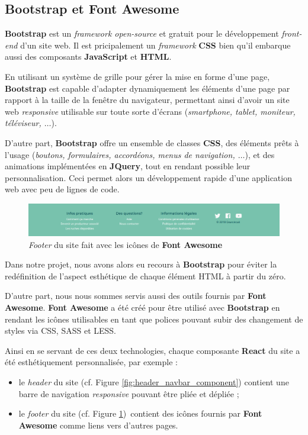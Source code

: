\documentclass[a4paper,12pt]{report}
\theoremstyle{break}
\theoremstyle{break}
\theoremstyle{break}
\theoremstyle{break}
\theoremstyle{definition}
\theoremstyle{remark}
\begin{document}
\subsection{Bootstrap et Font Awesome}
\textbf{Bootstrap} est un \textit{framework open-source} et gratuit pour le développement \textit{front-end} d'un site web. Il est pricipalement un \textit{framework} \textbf{CSS} bien qu'il embarque aussi des composants \textbf{JavaScript} et \textbf{HTML}.

En utilisant un système de grille pour gérer la mise en forme d'une page, \textbf{Bootstrap} est capable d'adapter dynamiquement les éléments d'une page par rapport à la taille de la fenêtre du navigateur, permettant ainsi d'avoir un site web \textit{responsive} utilisable sur toute sorte d'écrans (\textit{smartphone, tablet, moniteur, téléviseur, $\dots$}).

D'autre part, \textbf{Bootstrap} offre un ensemble de classes \textbf{CSS}, des éléments prêts à l'usage (\textit{boutons, formulaires, accordéons, menus de navigation, $\dots$}), et des animations implémentées en \textbf{JQuery}, tout en rendant possible leur personnalisation. Ceci permet alors un développement rapide d'une application web avec peu de lignes de code.

\begin{figure}[!ht]
  \centering
  \includegraphics[scale=0.35]{images/footer.png}
  \caption{\textit{Footer} du site fait avec les icônes de \textbf{Font Awesome}}
  \label{fig:footer_font_awesome}
\end{figure}

Dans notre projet, nous avons alors eu recours à \textbf{Bootstrap} pour éviter la redéfinition de l'aspect esthétique de chaque élément HTML à partir du zéro.

D'autre part, nous nous sommes servis aussi des outils fournis par \textbf{Font Awesome}. \textbf{Font Awesome} a été créé pour être utilisé avec \textbf{Bootstrap} en rendant les icônes utilisables en tant que polices pouvant subir des changement de styles via CSS, SASS et LESS.

Ainsi en se servant de ces deux technologies, chaque composante \textbf{React} du site a été esthétiquement personnalisée, par exemple :
\begin{itemize}
  \item le \textit{header} du site (cf. Figure \ref{fig:header_navbar_component}) contient une barre de navigation \textit{responsive} pouvant être pliée et dépliée ;
  \item le \textit{footer} du site (cf. Figure \ref{fig:footer_font_awesome}) contient des icônes fournis par \textbf{Font Awesome} comme liens vers d'autres pages.
\end{itemize}
\end{document}
